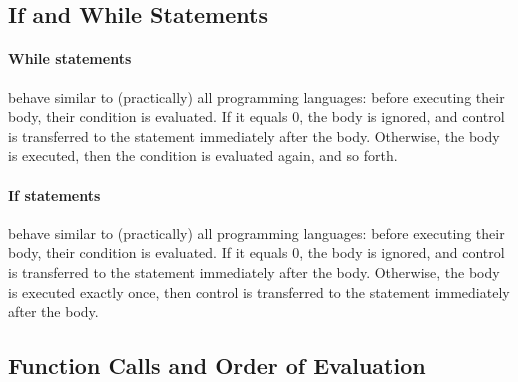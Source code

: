 \documentclass{article}
\begin{document}
\subsection{If and While Statements}
\label{subsection_If_And_While_Statements}
\paragraph{While statements} behave similar to (practically) all programming languages:
before executing their body, their condition is evaluated.
If it equals $0$, the body is ignored, and control is transferred
to the statement immediately after the body.
Otherwise, the body is executed, then the condition is evaluated again, and so forth. 
\paragraph{If statements} behave similar to (practically) all programming languages:
before executing their body, their condition is evaluated.
If it equals $0$, the body is ignored, and control is transferred
to the statement immediately after the body.
Otherwise, the body is executed exactly once,
then control is transferred to the statement immediately after the body. 
\subsection{Function Calls and Order of Evaluation}
\label{subsection_Function_Calls_And_Order_Of_Evaluation}
\end{document}
